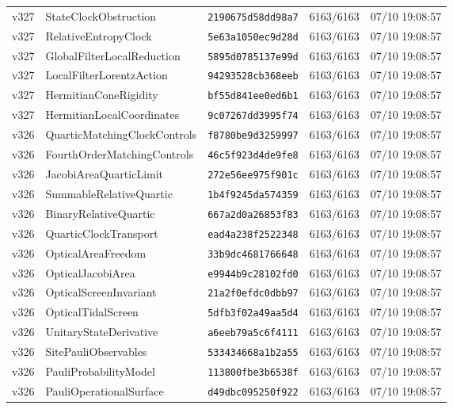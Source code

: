 \documentclass[11pt]{article}
\theoremstyle{definition}\newtheorem{deriv}{Derivação}
\begin{document}
{\begin{longtable}{@{}lllll@{}}
v327 & StateClockObstruction & \texttt{2190675d58dd98a7} & 6163/6163 & 07/10 19:08:57 \\
v327 & RelativeEntropyClock & \texttt{5e63a1050ec9d28d} & 6163/6163 & 07/10 19:08:57 \\
v327 & GlobalFilterLocalReduction & \texttt{5895d0785137e99d} & 6163/6163 & 07/10 19:08:57 \\
v327 & LocalFilterLorentzAction & \texttt{94293528cb368eeb} & 6163/6163 & 07/10 19:08:57 \\
v327 & HermitianConeRigidity & \texttt{bf55d841ee0ed6b1} & 6163/6163 & 07/10 19:08:57 \\
v327 & HermitianLocalCoordinates & \texttt{9c07267dd3995f74} & 6163/6163 & 07/10 19:08:57 \\
v326 & QuarticMatchingClockControls & \texttt{f8780be9d3259997} & 6163/6163 & 07/10 19:08:57 \\
v326 & FourthOrderMatchingControls & \texttt{46c5f923d4de9fe8} & 6163/6163 & 07/10 19:08:57 \\
v326 & JacobiAreaQuarticLimit & \texttt{272e56ee975f901c} & 6163/6163 & 07/10 19:08:57 \\
v326 & SummableRelativeQuartic & \texttt{1b4f9245da574359} & 6163/6163 & 07/10 19:08:57 \\
v326 & BinaryRelativeQuartic & \texttt{667a2d0a26853f83} & 6163/6163 & 07/10 19:08:57 \\
v326 & QuarticClockTransport & \texttt{ead4a238f2522348} & 6163/6163 & 07/10 19:08:57 \\
v326 & OpticalAreaFreedom & \texttt{33b9dc4681766648} & 6163/6163 & 07/10 19:08:57 \\
v326 & OpticalJacobiArea & \texttt{e9944b9c28102fd0} & 6163/6163 & 07/10 19:08:57 \\
v326 & OpticalScreenInvariant & \texttt{21a2f0efdc0dbb97} & 6163/6163 & 07/10 19:08:57 \\
v326 & OpticalTidalScreen & \texttt{5dfb3f02a49aa5d4} & 6163/6163 & 07/10 19:08:57 \\
v326 & UnitaryStateDerivative & \texttt{a6eeb79a5c6f4111} & 6163/6163 & 07/10 19:08:57 \\
v326 & SitePauliObservables & \texttt{533434668a1b2a55} & 6163/6163 & 07/10 19:08:57 \\
v326 & PauliProbabilityModel & \texttt{113800fbe3b6538f} & 6163/6163 & 07/10 19:08:57 \\
v326 & PauliOperationalSurface & \texttt{d49dbc095250f922} & 6163/6163 & 07/10 19:08:57 \\

\end{longtable}}
\end{document}

